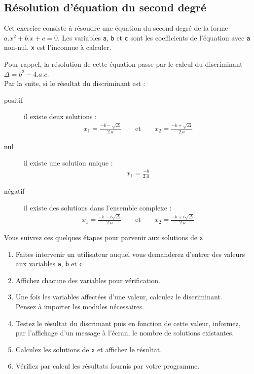 
\subsection{Résolution d'équation du second degré}

Cet exercice consiste à résoudre une équation du second degré de la forme
$a.x^2+b.x+c = 0$.
Les variables \texttt{a}, \texttt{b} et \texttt{c} sont les coefficients de l'équation
avec \texttt{a} non-nul. \texttt{x} est l'inconnue à calculer.

Pour rappel, la résolution de cette équation passe par le calcul du discriminant
$\Delta = b^2-4.a.c$.\\
Par la suite, si le résultat du discriminant est :
\begin{description}
\item[positif] il existe deux solutions :
\begin{eqnarray*}
  x_1 = \frac{-b-\sqrt{\Delta}}{2.a} \qquad \textrm{et} \qquad x_2=\frac{-b+\sqrt{\Delta}}{2.a}
\end{eqnarray*}
\item[nul] il existe une solution unique :
\begin{eqnarray*}
  x_1 = \frac{-b}{2.a}
\end{eqnarray*}
\item[négatif] il existe des solutions dans l'ensemble complexe :
\begin{eqnarray*}
  x_1 = \frac{-b-i\sqrt{\Delta}}{2.a} \qquad \textrm{et} \qquad x_2=\frac{-b+i\sqrt{\Delta}}{2.a}
\end{eqnarray*}
\end{description}

Vous suivrez ces quelques étapes pour parvenir aux solutions de \texttt{x}


\begin{enumerate}

\item Faites intervenir un utilisateur auquel vous demanderez  d'entrer des valeurs aux
  variables \texttt{a}, \texttt{b} et \texttt{c}
\item Affichez chacune des variables pour vérification.
\item Une fois les variables affectées d'une valeur, calculez le discriminant.\\
  Pensez à importer les modules nécessaires.
\item Testez le résultat du discrimant puis en fonction de cette valeur, informez,
  par l'affichage d'un message à l'écran, le nombre de solutions existantes.
\item Calculez les solutions de \texttt{x} et affichez le résultat.
\item Vérifiez par calcul les résultats fournis par votre programme.

\end{enumerate}
